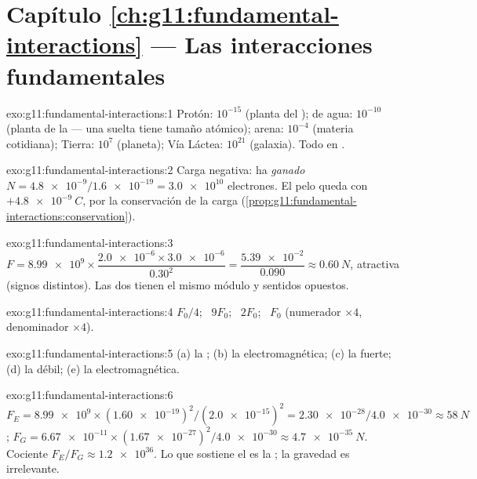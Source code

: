 \section*{Capítulo \ref{ch:g11:fundamental-interactions} --- Las interacciones fundamentales}

\begin{solution}{exo:g11:fundamental-interactions:1}
Protón: $10^{-15}$ (planta del );  de agua: $10^{-10}$
(planta de la  --- una  suelta tiene tamaño atómico);
arena: $10^{-4}$ (materia cotidiana); Tierra: $10^{7}$ (planeta); Vía
Láctea: $10^{21}$ (galaxia). Todo en .
\end{solution}

\begin{solution}{exo:g11:fundamental-interactions:2}
Carga negativa: ha \emph{ganado}
$N = \num{4.8e-9}/\num{1.6e-19} = \num{3.0e10}$ electrones. El pelo
queda con $+\qty{4.8e-9}{C}$, por la conservación de la carga
(\cref{prop:g11:fundamental-interactions:conservation}).
\end{solution}

\begin{solution}{exo:g11:fundamental-interactions:3}
$F = \num{8.99e9} \times \dfrac{\num{2.0e-6} \times \num{3.0e-6}}{0.30^2}
= \dfrac{\num{5.39e-2}}{0.090} \approx \qty{0.60}{N}$, atractiva (signos
distintos). Las dos  tienen el mismo módulo y sentidos opuestos.
\end{solution}

\begin{solution}{exo:g11:fundamental-interactions:4}
$F_0/4$; \ $9F_0$; \ $2F_0$; \ $F_0$ (numerador $\times 4$, denominador
$\times 4$).
\end{solution}

\begin{solution}{exo:g11:fundamental-interactions:5}
(a) la ; (b) la electromagnética; (c) la fuerte; (d) la
débil; (e) la electromagnética.
\end{solution}

\begin{solution}{exo:g11:fundamental-interactions:6}
$F_E = \num{8.99e9} \times (\num{1.60e-19})^2/(\num{2.0e-15})^2
= \num{2.30e-28}/\num{4.0e-30} \approx \qty{58}{N}$;
$F_G = \num{6.67e-11} \times (\num{1.67e-27})^2/\num{4.0e-30}
\approx \qty{4.7e-35}{N}$. Cociente $F_E/F_G \approx \num{1.2e36}$. Lo
que sostiene el  es la ; la gravedad es
irrelevante.
\end{solution}

